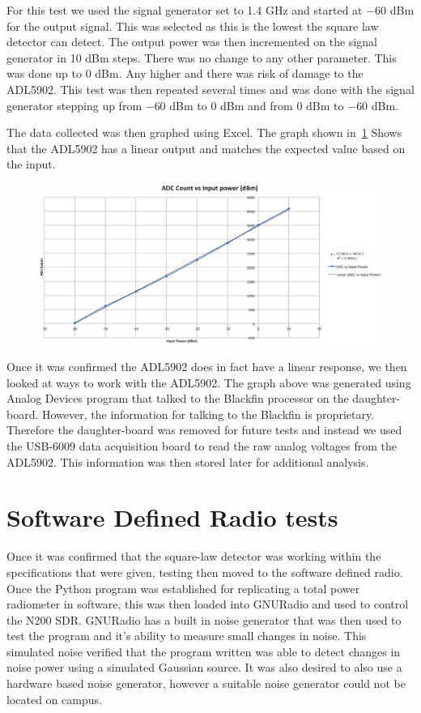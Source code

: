For this test we used the signal generator set to 1.4 GHz and started at $-60$ dBm for the output signal.  This was selected as this is the lowest the square law detector can detect.  The output power was then incremented on the signal generator in 10 dBm steps.  There was no change to any other parameter.  This was done up to 0 dBm.  Any higher and there was risk of damage to the ADL5902.  This test was then repeated several times and was done with the signal generator stepping up from $-60$ dBm to 0 dBm and from 0 dBm to $-60$ dBm.  

The data collected was then graphed using Excel.  The graph shown in~\ref{adl5902_linear}
Shows that the ADL5902 has a linear output and matches the expected value based on the input.  

\begin{figure}[h!tb] \centering

\includegraphics[width=\textwidth]{Images/Linearsquarelaw}

\label{adl5902_linear}
\end{figure}

Once it was confirmed the ADL5902 does in fact have a linear response, we then looked at ways to work with the ADL5902.  The graph above was generated using Analog Devices program that talked to the Blackfin processor on the daughter-board.  However, the information for talking to the Blackfin is proprietary.  Therefore the daughter-board was removed for future tests and instead we used the USB-6009 data acquisition board to read the raw analog voltages from the ADL5902.  This information was then stored later for additional analysis.  

\section{Software Defined Radio tests}
Once it was confirmed that the square-law detector was working within the specifications that were given, testing then moved to the software defined radio.  Once the Python program was established for replicating a total power radiometer in software, this was then loaded into GNURadio and used to control the N200 SDR.  GNURadio has a built in noise generator that was then used to test the program and it's ability to measure small changes in noise.  This simulated noise verified that the program written was able to detect changes in noise power using a simulated Gaussian source.  It was also desired to also use a hardware based noise generator, however a suitable noise generator could not be located on campus.

